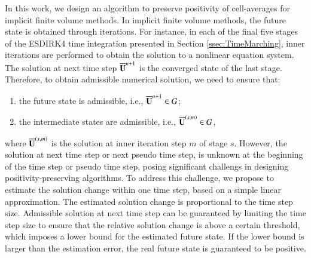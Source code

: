 In this work, we design an algorithm to preserve positivity of cell-averages for implicit finite volume methods. In implicit finite volume methods, the future state is obtained through iterations. For instance, in each of the final five stages of the ESDIRK4 time integration presented in Section \ref{ssec:TimeMarching}, inner iterations are performed to obtain the solution to a nonlinear equation system. The solution at next time step $\overline{\mathbf{U}}^{n+1}$ is the converged state of the last stage. Therefore, to obtain admissible numerical solution, we need to ensure that:
\begin{enumerate}[label=(\alph*)]
    \item the future state is admissible, i.e., $\overline{\mathbf{U}}^{n+1} \in G$;
    \item the intermediate states are admissible, i.e., $\overline{\mathbf{U}}^{\left(s,m\right)} \in G$,
\end{enumerate}
where $\overline{\mathbf{U}}^{\left(s,m\right)}$ is the solution at inner iteration step $m$ of stage $s$. However, the solution at next time step or next pseudo time step, is unknown at the beginning of the time step or pseudo time step, posing significant challengs in designing positivity-preserving algorithms. 
To address this challenge, we propose to estimate the solution change within one time step, based on a simple linear approximation. The estimated solution change is proportional to the time step size. Admissible solution at next time step can be guaranteed by limiting the time step size to ensure that the relative solution change is above a certain threshold, which imposes a lower bound for the estimated future state. If the lower bound is larger than the estimation error, the real future state is guaranteed to be positive.   

